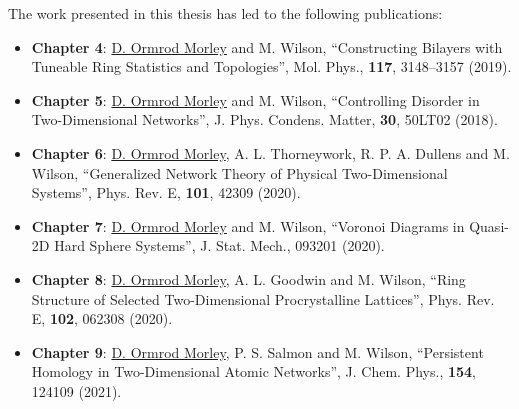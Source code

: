 The work presented in this thesis has led to the following publications:

\begin{itemize}

	\item \textbf{Chapter 4}: \underline{D. Ormrod Morley} and M. Wilson, ``Constructing Bilayers with Tuneable Ring Statistics and Topologies'', Mol. Phys., \textbf{117}, 3148–3157 (2019).

	\item \textbf{Chapter 5}: \underline{D. Ormrod Morley} and M. Wilson, ``Controlling Disorder in Two\--Dimensional Networks'', J. Phys. Condens. Matter, \textbf{30}, 50LT02 (2018).
	
	\item \textbf{Chapter 6}: \underline{D. Ormrod Morley}, A. L. Thorneywork, R. P. A. Dullens and M. Wilson, ``Generalized Network Theory of Physical Two\--Dimensional Systems'', Phys. Rev. E, \textbf{101}, 42309 (2020).
	
	\item \textbf{Chapter 7}: \underline{D. Ormrod Morley} and M. Wilson, ``Voronoi Diagrams in Quasi\--2D Hard Sphere Systems'', J. Stat. Mech., 093201 (2020).
	
	\item \textbf{Chapter 8}: \underline{D. Ormrod Morley}, A. L. Goodwin and M. Wilson, ``Ring Structure of Selected Two\--Dimensional Procrystalline Lattices'', Phys. Rev. E, \textbf{102}, 062308 (2020).
	
	\item \textbf{Chapter 9}: \underline{D. Ormrod Morley}, P. S. Salmon and M. Wilson, ``Persistent Homology in Two\--Dimensional Atomic Networks'', J. Chem. Phys., \textbf{154}, 124109 (2021).
	
\end{itemize}
